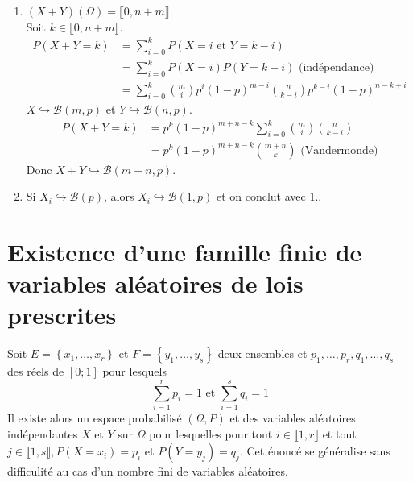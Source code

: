 \documentclass[../main.tex]{subfiles}
\begin{document}
\begin{enumerate}
    \item $(X + Y)(\Omega) = \llbracket 0, n + m \rrbracket$. \\
    Soit $k\in \llbracket 0, n + m \rrbracket$.
    \begin{align*}
        P(X + Y = k) &= \sum_{i=0}^{k} P(X = i \text{ et } Y = k - i) \\
        &= \sum_{i=0}^{k} P(X = i) P(Y = k - i) \text{ (indépendance)} \\
        &= \sum_{i=0}^{k} \binom{m}{i} p^i (1-p)^{m-i} \binom{n}{k-i} p^{k-i} (1-p)^{n-k+i}
    \end{align*}
    $X\hookrightarrow \mathcal{B}(m, p)$ et $Y\hookrightarrow \mathcal{B}(n, p)$. 
    \begin{align*}
        P(X + Y = k) &= p^k (1-p)^{m+n-k} \sum_{i=0}^{k} \binom{m}{i} \binom{n}{k-i} \\
        &= p^k (1-p)^{m+n-k} \binom{m+n}{k} \text{ (Vandermonde)}
    \end{align*}
    Donc $X + Y \hookrightarrow \mathcal{B}(m+n, p)$.

    \item Si $X_i \hookrightarrow \mathcal{B}(p)$, alors $X_i\hookrightarrow \mathcal{B}(1, p)$ et on conclut avec $\boxed{1.}$. 
\end{enumerate}

\section{Existence d'une famille finie de variables aléatoires de lois prescrites}
\begin{tcolorbox}[title=Théorème 32.69, title filled=false, colframe=orange, colback=orange!10!white]
    Soit $E=\left\{x_1, \ldots, x_r\right\}$ et $F=\left\{y_1, \ldots, y_s\right\}$ deux ensembles et $p_1, \ldots, p_r, q_1, \ldots, q_s$ des réels de $[0 ; 1]$ pour lesquels
    $$\sum_{i=1}^r p_i=1 \text { et } \sum_{i=1}^s q_i=1$$
    Il existe alors un espace probabilisé $(\Omega, P)$ et des variables aléatoires indépendantes $X$ et $Y$ sur $\Omega$ pour lesquelles pour tout $i \in \llbracket 1, r \rrbracket$ et tout $j \in \llbracket 1, s \rrbracket, P\left(X=x_i\right)=p_i$ et $P\left(Y=y_j\right)=q_j$.
    Cet énoncé se généralise sans difficulité au cas d'un nombre fini de variables aléatoires.
\end{tcolorbox}
\end{document}
